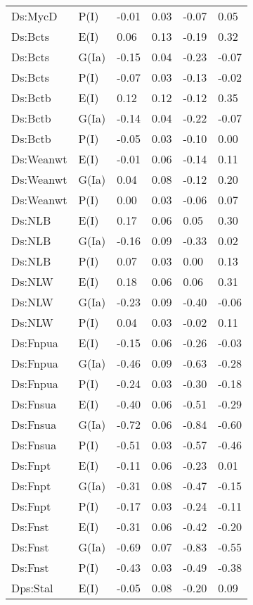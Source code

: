 \begin{center}
\begin{longtable}{|p{1.1in}|p{0.7in}|p{0.7in}|p{0.6in}|p{0.6in}|p{0.6in}|}
  Ds:MycD & P(I) & -0.01 & 0.03 & -0.07 & 0.05 \\ 
  Ds:Bcts & E(I) & 0.06 & 0.13 & -0.19 & 0.32 \\ 
  Ds:Bcts & G(Ia) & -0.15 & 0.04 & -0.23 & -0.07 \\ 
  Ds:Bcts & P(I) & -0.07 & 0.03 & -0.13 & -0.02 \\ 
  Ds:Bctb & E(I) & 0.12 & 0.12 & -0.12 & 0.35 \\ 
  Ds:Bctb & G(Ia) & -0.14 & 0.04 & -0.22 & -0.07 \\ 
  Ds:Bctb & P(I) & -0.05 & 0.03 & -0.10 & 0.00 \\ 
  Ds:Weanwt & E(I) & -0.01 & 0.06 & -0.14 & 0.11 \\ 
  Ds:Weanwt & G(Ia) & 0.04 & 0.08 & -0.12 & 0.20 \\ 
  Ds:Weanwt & P(I) & 0.00 & 0.03 & -0.06 & 0.07 \\ 
  Ds:NLB & E(I) & 0.17 & 0.06 & 0.05 & 0.30 \\ 
  Ds:NLB & G(Ia) & -0.16 & 0.09 & -0.33 & 0.02 \\ 
  Ds:NLB & P(I) & 0.07 & 0.03 & 0.00 & 0.13 \\ 
  Ds:NLW & E(I) & 0.18 & 0.06 & 0.06 & 0.31 \\ 
  Ds:NLW & G(Ia) & -0.23 & 0.09 & -0.40 & -0.06 \\ 
  Ds:NLW & P(I) & 0.04 & 0.03 & -0.02 & 0.11 \\ 
  Ds:Fnpua & E(I) & -0.15 & 0.06 & -0.26 & -0.03 \\ 
  Ds:Fnpua & G(Ia) & -0.46 & 0.09 & -0.63 & -0.28 \\ 
  Ds:Fnpua & P(I) & -0.24 & 0.03 & -0.30 & -0.18 \\ 
  Ds:Fnsua & E(I) & -0.40 & 0.06 & -0.51 & -0.29 \\ 
  Ds:Fnsua & G(Ia) & -0.72 & 0.06 & -0.84 & -0.60 \\ 
  Ds:Fnsua & P(I) & -0.51 & 0.03 & -0.57 & -0.46 \\ 
  Ds:Fnpt & E(I) & -0.11 & 0.06 & -0.23 & 0.01 \\ 
  Ds:Fnpt & G(Ia) & -0.31 & 0.08 & -0.47 & -0.15 \\ 
  Ds:Fnpt & P(I) & -0.17 & 0.03 & -0.24 & -0.11 \\ 
  Ds:Fnst & E(I) & -0.31 & 0.06 & -0.42 & -0.20 \\ 
  Ds:Fnst & G(Ia) & -0.69 & 0.07 & -0.83 & -0.55 \\ 
  Ds:Fnst & P(I) & -0.43 & 0.03 & -0.49 & -0.38 \\ 
  Dps:Stal & E(I) & -0.05 & 0.08 & -0.20 & 0.09 \\ 

\end{longtable}
\end{center}
